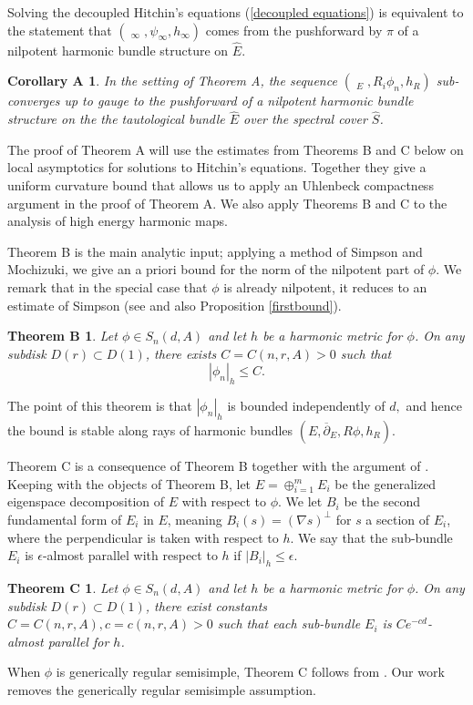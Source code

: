 \documentclass[10pt]{amsart}
\DeclareMathOperator{\dbar}{\overline{\partial}}
\newtheorem*{thmb}{Theorem B}
\newtheorem*{thmc}{Theorem C}
\newtheorem*{cora}{Corollary A}
\theoremstyle{definition}
\begin{document}
Solving the decoupled Hitchin's equations (\ref{decoupled equations}) is equivalent to the statement that $(\dbar_\infty, \psi_\infty, h_\infty)$ comes from the pushforward by $\pi$ of a nilpotent harmonic bundle structure on $\hat{E}$.

\begin{cora}
    In the setting of Theorem A, the sequence $(\dbar_E, R_i\phi_n,h_R)$ sub-converges up to gauge to the pushforward of a nilpotent harmonic bundle structure on the the tautological bundle $\hat{E}$ over the spectral cover $\hat{S}$.
\end{cora}

The proof of Theorem A will use the estimates from Theorems B and C below on local asymptotics for solutions to Hitchin's equations. Together they give a uniform curvature bound that allows us to apply an Uhlenbeck compactness argument in the proof of Theorem A. We also apply Theorems B and C to the analysis of high energy harmonic maps.

Theorem B is the main analytic input; applying a method of Simpson and Mochizuki, we give an a priori bound for the norm of the nilpotent part of $\phi$. We remark that in the special case that $\phi$ is already nilpotent, it reduces to an estimate of Simpson (see \cite[section 2]{S} and also Proposition \ref{firstbound}).
\begin{thmb}\label{mainestimate} Let $\phi \in S_n(d,A)$ and let $h$ be a harmonic metric for $\phi$. On any subdisk $D(r)\subset D(1)$, there exists $C=C(n,r,A)>0$ such that
$$|\phi_n|_h\leq C.$$
\end{thmb}
The point of this theorem is that $|\phi_n|_h$ is bounded independently of $d,$ and hence the bound is stable along rays of harmonic bundles $(E,\overline{\partial}_E,R\phi,h_R).$ 

Theorem C is a consequence of Theorem B together with the argument of \cite[Proposition 2.11]{Mo}. Keeping with the objects of Theorem B, let $E=\oplus_{i=1}^m E_i$ be the generalized eigenspace decomposition of $E$ with respect to $\phi$. We let $B_i$ be the second fundamental form of $E_i$ in $E$, meaning $B_i(s) = (\nabla s)^\perp$ for $s$ a section of $E_i$, where the perpendicular is taken with respect to $h$. We say that the sub-bundle $E_i$ is $\epsilon$-almost parallel with respect to $h$ if $|B_i|_h \leq \epsilon$.

\begin{thmc}
 Let $\phi \in S_n(d,A)$ and let $h$ be a harmonic metric for $\phi$. 
    On any subdisk $D(r)\subset D(1)$, there exist constants $C=C(n,r,A), c=c(n,r,A)>0$ such that each sub-bundle $E_i$ is $Ce^{-cd}$-almost parallel for $h$.
\end{thmc}
When $\phi$ is generically regular semisimple, Theorem C follows from \cite[Proposition 2.11]{Mo}. Our work removes the generically regular semisimple assumption. 
\end{document}
